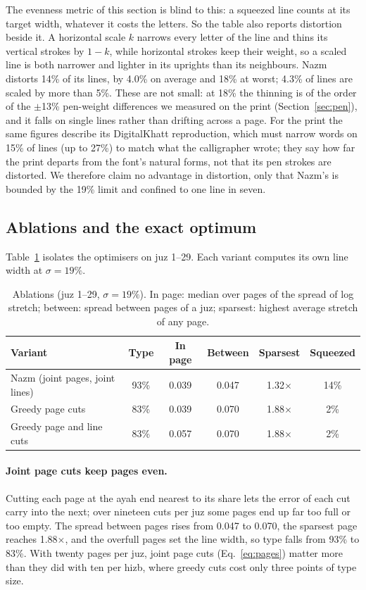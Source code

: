 \documentclass[sigconf,nonacm]{acmart}
\newcommand{\x}{\ensuremath{\times}}
\begin{document}
The evenness metric of this section is blind to this: a squeezed line counts at its target width, whatever it costs the letters. So the table also reports distortion beside it. A horizontal scale $k$ narrows every letter of the line and thins its vertical strokes by $1-k$, while horizontal strokes keep their weight, so a scaled line is both narrower and lighter in its uprights than its neighbours. Nazm distorts 14\% of its lines, by 4.0\% on average and 18\% at worst; 4.3\% of lines are scaled by more than 5\%. These are not small: at 18\% the thinning is of the order of the $\pm$13\% pen-weight differences we measured on the print (Section~\ref{sec:pen}), and it falls on single lines rather than drifting across a page. For the print the same figures describe its DigitalKhatt reproduction, which must narrow words on 15\% of lines (up to 27\%) to match what the calligrapher wrote; they say how far the print departs from the font's natural forms, not that its pen strokes are distorted. We therefore claim no advantage in distortion, only that Nazm's is bounded by the 19\% limit and confined to one line in seven.

\subsection{Ablations and the exact optimum}\label{sec:ablation}
Table~\ref{tab:ablation} isolates the optimisers on juz 1--29. Each variant computes its own line width at $\sigma=19\%$.

\begin{table}[t]
  \centering\small
  \caption{Ablations (juz 1--29, $\sigma=19\%$). In page: median over pages of the spread of log stretch; between: spread between pages of a juz; sparsest: highest average stretch of any page.}
  \label{tab:ablation}
  \begin{tabularx}{\linewidth}{@{}Xccccc@{}}
    \toprule
    Variant & Type & In page & Between & Sparsest & Squeezed \\
    \midrule
    \rowcolor{nazm!10} Nazm (joint pages, joint lines) & 93\% & 0.039 & 0.047 & 1.32\x & 14\% \\
    Greedy page cuts & 83\% & 0.039 & 0.070 & 1.88\x & 2\% \\
    Greedy page and line cuts & 83\% & 0.057 & 0.070 & 1.88\x & 2\% \\
    \bottomrule
  \end{tabularx}
\end{table}

\paragraph{Joint page cuts keep pages even.} Cutting each page at the ayah end nearest to its share lets the error of each cut carry into the next; over nineteen cuts per juz some pages end up far too full or too empty. The spread between pages rises from 0.047 to 0.070, the sparsest page reaches 1.88\x, and the overfull pages set the line width, so type falls from 93\% to 83\%. With twenty pages per juz, joint page cuts (Eq.~\ref{eq:pages}) matter more than they did with ten per hizb, where greedy cuts cost only three points of type size.
\end{document}
